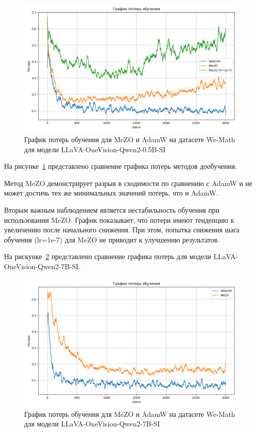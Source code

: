\documentclass[LI,KR]{HSEUniversity}
\begin{document}
\begin{figure}[H]
    \centering
    \includegraphics[width=\textwidth]{images/convergence_gap_and_instability}
    \caption{График потерь обучения для MeZO и AdamW на датасете We-Math для модели LLaVA-OneVision-Qwen2-0.5B-SI}
    \label{fig:convergence_gap}
\end{figure}

На рисунке~\ref{fig:convergence_gap} представлено сравнение графика потерь методов дообучения.

Метод MeZO демонстрирует разрыв в сходимости по сравнению с AdamW и не может достичь тех же минимальных значений потерь, что и AdamW.

Вторым важным наблюдением является нестабильность обучения при использовании MeZO.
График показывает, что потери имеют тенденцию к увеличению после начального снижения.
При этом, попытка снижения шага обучения (lr=1e-7) для MeZO не приводит к улучшению результатов.

На рискунке~\ref{fig:convergence_gap_7b} представлено сравнение графика потерь для модели LLaVA-OneVision-Qwen2-7B-SI.

\begin{figure}[H]
    \centering
    \includegraphics[width=\textwidth]{images/convergence_gap_7b}
    \caption{График потерь обучения для MeZO и AdamW на датасете We-Math для модели LLaVA-OneVision-Qwen2-7B-SI}
    \label{fig:convergence_gap_7b}
\end{figure}
\end{document}
